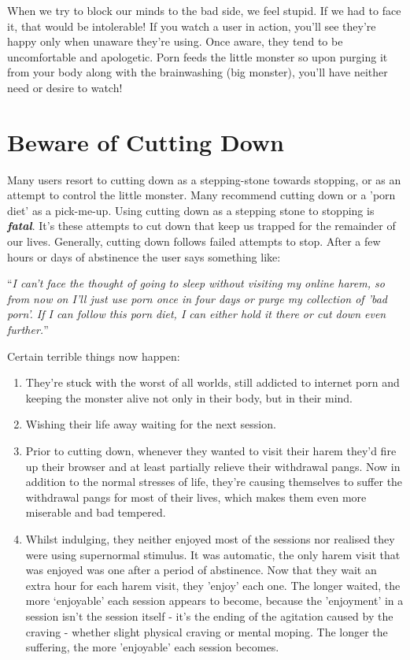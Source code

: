 \documentclass[
]{book}
\begin{document}
When we try to block our minds to the bad side, we feel stupid. If we had to face it, that would be intolerable! If you watch a user in action, you'll see they're happy only when unaware they're using. Once aware, they tend to be uncomfortable and apologetic. Porn feeds the little monster so upon purging it from your body along with the brainwashing (big monster), you'll have neither need or desire to watch!

\hypertarget{beware-of-cutting-down}{%
\chapter{Beware of Cutting Down}\label{beware-of-cutting-down}}

Many users resort to cutting down as a stepping-stone towards stopping, or as an attempt to control the little monster. Many recommend cutting down or a 'porn diet' as a pick-me-up. Using cutting down as a stepping stone to stopping is \textbf{\emph{fatal}}. It's these attempts to cut down that keep us trapped for the remainder of our lives. Generally, cutting down follows failed attempts to stop. After a few hours or days of abstinence the user says something like:

``\emph{I can't face the thought of going to sleep without visiting my online harem, so from now on I'll just use porn once in four days or purge my collection of 'bad porn'. If I can follow this porn diet, I can either hold it there or cut down even further.}''

Certain terrible things now happen:

\begin{enumerate}
\def\labelenumi{\arabic{enumi}.}
\item
  They're stuck with the worst of all worlds, still addicted to internet porn and keeping the monster alive not only in their body, but in their mind.
\item
  Wishing their life away waiting for the next session.
\item
  Prior to cutting down, whenever they wanted to visit their harem they'd fire up their browser and at least partially relieve their withdrawal pangs. Now in addition to the normal stresses of life, they're causing themselves to suffer the withdrawal pangs for most of their lives, which makes them even more miserable and bad tempered.
\item
  Whilst indulging, they neither enjoyed most of the sessions nor realised they were using supernormal stimulus. It was automatic, the only harem visit that was enjoyed was one after a period of abstinence.
  Now that they wait an extra hour for each harem visit, they 'enjoy' each one. The longer waited, the more `enjoyable' each session appears to become, because the 'enjoyment' in a session isn't the session itself - it's the ending of the agitation caused by the craving - whether slight physical craving or mental moping. The longer the suffering, the more 'enjoyable' each session becomes.
\end{enumerate}
\end{document}
